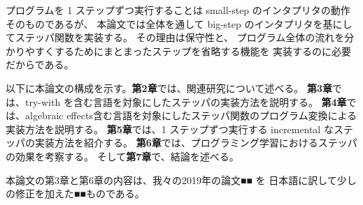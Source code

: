 プログラムを 1 ステップずつ実行することは
small-step のインタプリタの動作そのものであるが、
本論文では全体を通して big-step のインタプリタを基にしてステッパ関数を実装する。
その理由は保守性と、
プログラム全体の流れを分かりやすくするためにまとまったステップを省略する機能を
実装するのに必要だからである。

\vspace{1cm}
以下に本論文の構成を示す。{\bf 第2章}では、関連研究について述べる。
{\bf 第3章}では、try-with を含む言語を対象にしたステッパの実装方法を説明する。
{\bf 第4章}では、algebraic effects含む言語を対象にしたステッパ関数のプログラム変換による実装方法を説明する。
{\bf 第5章}では、1 ステップずつ実行する incremental なステッパの実装方法を紹介する。
{\bf 第6章}では、プログラミング学習におけるステッパの効果を考察する。
そして{\bf 第7章}で、結論を述べる。

本論文の第3章と第6章の内容は、我々の2019年の論文■■ \cite{FCA19} を
日本語に訳して少しの修正を加えた■■ものである。
